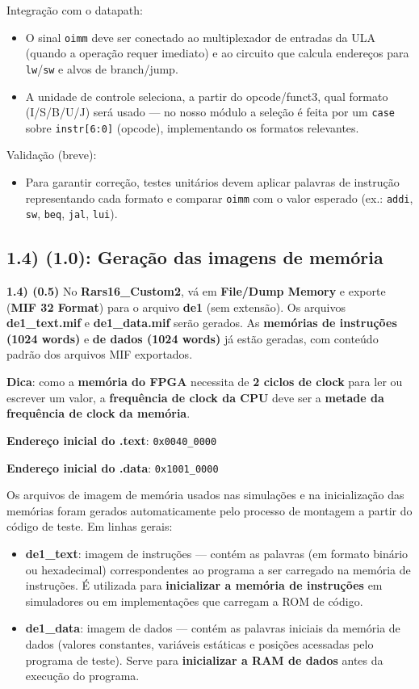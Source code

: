 \documentclass[12pt,a4paper]{article}
\begin{document}
Integração com o datapath:
\begin{itemize}
    \item O sinal \texttt{oimm} deve ser conectado ao multiplexador de entradas da ULA (quando a operação requer imediato) e ao circuito que calcula endereços para \texttt{lw}/\texttt{sw} e alvos de branch/jump.
    \item A unidade de controle seleciona, a partir do opcode/funct3, qual formato (I/S/B/U/J) será usado — no nosso módulo a seleção é feita por um \texttt{case} sobre \texttt{instr[6:0]} (opcode), implementando os formatos relevantes.
\end{itemize}

Validação (breve):
\begin{itemize}
    \item Para garantir correção, testes unitários devem aplicar palavras de instrução representando cada formato e comparar \texttt{oimm} com o valor esperado (ex.: \texttt{addi}, \texttt{sw}, \texttt{beq}, \texttt{jal}, \texttt{lui}).
\end{itemize}

\subsection*{\textbf{1.4) (1.0): Geração das imagens de memória}}

\textbf{1.4) (0.5)} No \textbf{Rars16\_Custom2}, vá em \textbf{File/Dump Memory} e exporte (\textbf{MIF 32 Format}) para o arquivo \textbf{de1} (sem extensão). Os arquivos \textbf{de1\_text.mif} e \textbf{de1\_data.mif} serão gerados.  
As \textbf{memórias de instruções (1024 words)} e \textbf{de dados (1024 words)} já estão geradas, com conteúdo padrão dos arquivos MIF exportados.  

\textbf{Dica}: como a \textbf{memória do FPGA} necessita de \textbf{2 ciclos de clock} para ler ou escrever um valor, a \textbf{frequência de clock da CPU} deve ser a \textbf{metade da frequência de clock da memória}.  

\textbf{Endereço inicial do .text}: \texttt{0x0040\_0000}  

\textbf{Endereço inicial do .data}: \texttt{0x1001\_0000}  

Os arquivos de imagem de memória usados nas simulações e na inicialização das memórias foram gerados automaticamente pelo processo de montagem a partir do código de teste. Em linhas gerais:

\begin{itemize}
    \item \textbf{de1\_text}: imagem de instruções — contém as palavras (em formato binário ou hexadecimal) correspondentes ao programa a ser carregado na memória de instruções. É utilizada para \textbf{inicializar a memória de instruções} em simuladores ou em implementações que carregam a ROM de código.
    \item \textbf{de1\_data}: imagem de dados — contém as palavras iniciais da memória de dados (valores constantes, variáveis estáticas e posições acessadas pelo programa de teste). Serve para \textbf{inicializar a RAM de dados} antes da execução do programa.
\end{itemize}
\end{document}
